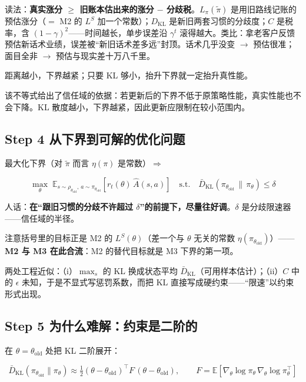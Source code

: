 \documentclass[UTF8,12pt,a4paper]{ctexrep}
\newcommand{\plain}[1]{\begin{plainbox}#1\end{plainbox}}
\newcommand{\pin}[1]{\begin{pinbox}#1\end{pinbox}}
\begin{document}
\plain{读法：\textbf{真实涨分 $\ge$ 旧账本估出来的涨分 $-$ 分歧税}。$L_\pi(\tilde\pi)$ 是用旧路线记账的预估涨分（$=$ M2 的 $L^{S}$ 加一个常数）；$D_{\mathrm{KL}}$ 是新旧两套习惯的分歧度；$C$ 是税率，含 $(1-\gamma)^2$——时间越长，单步误差沿 $\gamma^t$ 滚得越大。类比：拿老客户反馈预估新话术业绩，误差被``新旧话术差多远''封顶。话术几乎没变 $\to$ 预估很准；面目全非 $\to$ 预估与现实差十万八千里。}

距离越小，下界越紧；只要 KL 够小，抬升下界就一定抬升真性能。

\pin{该不等式给出了信任域的依据：若更新后的下界不低于原策略性能，真实性能也不会下降。KL 散度越小，下界越紧，因此更新应限制在较小范围内。}

\subsection*{Step 4 \; 从下界到可解的优化问题}

最大化下界（对 $\tilde\pi$ 而言 $\eta(\pi)$ 是常数）$\Longrightarrow$

$$
\max_{\theta}\; \mathbb{E}_{s\sim\rho_{\theta_{\mathrm{old}}},\,a\sim\pi_{\theta_{\mathrm{old}}}}\left[r_t(\theta)\, \hat{A}(s,a)\right]
\quad \text{s.t.}\quad \bar{D}_{\mathrm{KL}}(\pi_{\theta_{\mathrm{old}}}\,\|\,\pi_\theta) \le \delta
$$

\plain{人话：\textbf{在``跟旧习惯的分歧不许超过 $\delta$''的前提下，尽量往好调}。$\delta$ 是分歧限速器——信任域的半径。}

注意括号里的目标正是 M2 的 $L^{S}(\theta)$（差一个与 $\theta$ 无关的常数 $\eta(\pi_{\theta_{\mathrm{old}}})$）——\textbf{M2 与 M3 在此合流}：M2 的替代目标就是 M3 下界的第一项。

两处工程近似：（i）$\max_s$ 的 KL 换成状态平均 $\bar{D}_{\mathrm{KL}}$（可用样本估计）；（ii）$C$ 中的 $\epsilon$ 未知，于是不显式写惩罚系数，而把 KL 直接写成硬约束——``限速''以约束形式出现。

\subsection*{Step 5 \; 为什么难解：约束是二阶的}

在 $\theta = \theta_{\mathrm{old}}$ 处把 KL 二阶展开：

$$
\bar{D}_{\mathrm{KL}}(\pi_{\theta_{\mathrm{old}}}\|\pi_\theta) \approx \tfrac{1}{2}(\theta - \theta_{\mathrm{old}})^{\top} F\,(\theta - \theta_{\mathrm{old}}),
\qquad
F = \mathbb{E}\left[\nabla_\theta \log \pi_\theta\, \nabla_\theta \log \pi_\theta^{\top}\right]
$$
\end{document}
